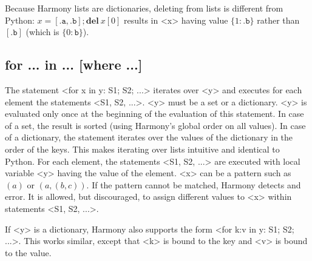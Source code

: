 \documentclass{report}
\begin{document}
Because Harmony lists are dictionaries, deleting from lists is different
from Python:
$x = [\mathtt{.a}, \mathtt{.b}]; \mathbf{del}~x[0]$ results in <{x}> having value
$\{1: \mathtt{.b}\}$ rather than $[\mathtt{.b}]$ (which is $\{0: \mathtt{b}\}$).

\subsection*{\textbf{for ... in ... [where ...]}}

The statement <{for x in y: S1; S2; ...}>
iterates over <{y}> and executes for each element the statements
<{S1, S2, ...}>.
<{y}> must be a set or a dictionary.  <{y}> is evaluated only once at
the beginning of the evaluation of this statement.  In case of a set,
the result is sorted (using Harmony's global order on all values).
In case of a dictionary, the statement iterates over the values of
the dictionary in the order of the keys.  This makes iterating over
lists intuitive and identical to Python.
For each element, the statements <{S1, S2, ...}> are executed with
local variable <{y}> having the value of the element.
<{x}> can be a pattern such as $(a)$ or $(a, (b, c))$.
If the pattern cannot be matched, Harmony detects and error.
It is allowed, but discouraged, to assign different values to <{x}>
within statements <{S1, S2, ...}>.

If <{y}> is a dictionary, Harmony also supports the form
<{for k:v in y: S1; S2; ...}>.  This works similar,
except that <{k}> is bound to the key and <{v}> is bound to the value.
\end{document}

